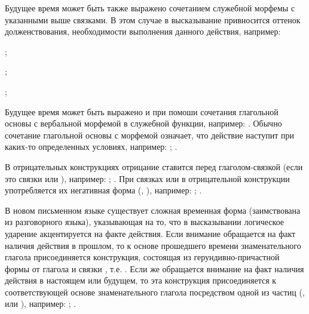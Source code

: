 Будущее время может быть также выражено сочетанием служебной морфемы  с указанными выше связками. В этом случае в высказывание привносится оттенок долженствования, необходимости выполнения данного действия, например:
\begin{description}
	\item{};
	\item{};
	\item{};
\end{description}

Будущее время может быть выражено и при помоши сочетания глагольной основы с вербальной морфемой  в служебной функции, например:
.
Обычно сочетание глагольной основы с морфемой  означает, что действие наступит при каких-то определенных условиях, например:
;
.

В отрицательных конструкциях отрицание ставится перед глаголом-связкой (если это связки	 или ), например:
;
.
При связках	 или  в отрицательной конструкции употребляется их негативная форма (, ), например:
;
.

В новом письменном языке существует сложная временная форма (заимствована из разговорного языка), указывающая на то, что в высказывании логическое ударение акцентируется на факте действия. Если внимание обращается на факт наличия действия в прошлом, то к основе прошедшего времени знаменательного глагола присоединяется конструкция, состоящая из герундивно-причастной формы от глагола  и связки , т.е. . Если же обращается внимание на факт наличия действия в настоящем или будущем, то эта конструкция присоединяется к соответствующей основе знаменательного глагола посредством одной из частиц (,  или ), например:
;
.

